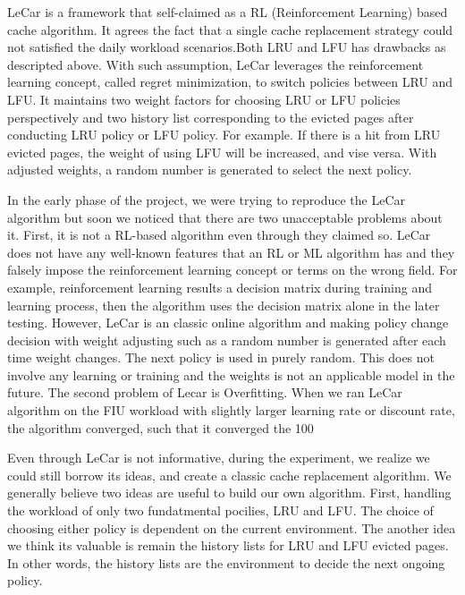 \documentclass[letterpaper,twocolumn,10pt]{article}
\begin{document}
LeCar is a framework that self-claimed as a RL (Reinforcement Learning) based cache algorithm. It agrees the fact that a single cache replacement strategy could not satisfied the daily workload scenarios.Both LRU and LFU has drawbacks as descripted above. With such assumption, LeCar leverages the reinforcement learning concept, called regret minimization, to switch policies between LRU and LFU. It maintains two weight factors for choosing LRU or LFU policies perspectively and two history list corresponding to the evicted pages after conducting LRU policy or LFU policy. For example. If there is a hit from LRU evicted pages, the weight of using LFU will be increased, and vise versa. With adjusted weights, a random number is generated to select the next policy. 

In the early phase of the project, we were trying to reproduce the LeCar algorithm but soon we noticed that there are two unacceptable problems about it. First, it is not a RL-based algorithm even through they claimed so. LeCar does not have any well-known features that an RL or ML algorithm has and they falsely impose the reinforcement learning concept or terms on the wrong field. For example, reinforcement learning results a decision matrix during training and learning process, then the algorithm uses the decision matrix alone in the later testing. However, LeCar is an classic online algorithm and making policy change decision with weight adjusting such as a random number is generated after each time weight changes. The next policy is used in purely random. This does not involve any learning or training and the weights is not an applicable model in the future. The second problem of Lecar is Overfitting. When we ran LeCar algorithm on the FIU workload with slightly larger learning rate or discount rate, the algorithm converged, such that it converged the 100%

Even through LeCar is not informative, during the experiment, we realize we could still borrow its ideas, and create a classic cache replacement algorithm. We generally believe two ideas are useful to build our own algorithm. First, handling the workload of only two fundatmental pocilies, LRU and LFU. The choice of choosing either policy is dependent on the current environment. The another idea we think its valuable is remain the history lists for LRU and LFU evicted pages. In other words, the history lists are the environment to decide the next ongoing policy. 
\end{document}
